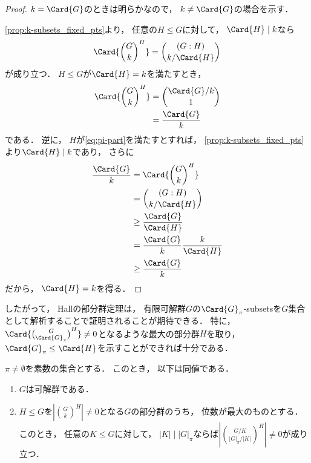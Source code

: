 \documentclass{jlreq}
\newcommand{\FixedPts}[2]{{#1}^{#2}}
\newcommand{\Index}[2]{\left(#2 : #1\right)}
\newcommand{\Order}[1]{\left| #1 \right|}
\begin{document}
	\begin{proof}
		$k = \Card{G}$のときは明らかなので，
		$k \ne \Card{G}$の場合を示す．
		
		\cref{prop:k-subsets_fixed_pts}より，
		任意の$H \le G$に対して，
		$\Card{H} \mid k$なら
		\begin{equation}
			\Card{\FixedPts{\binom{G}{k}}{H}}
			= \binom{\Index{H}{G}}{k / \Card{H}}
		\end{equation}
		が成り立つ．
		$H \le G$が$\Card{H} = k$を満たすとき，
		\begin{align}
			\Card{\FixedPts{\binom{G}{k}}{H}}
			&= \binom{\Card{G}/k}{1} \\
			&= \frac{\Card{G}}{k}
		\end{align}
		である．
		逆に，
		$H$が\cref{eq:pi-part}を満たすとすれば，
		\cref{prop:k-subsets_fixed_pts}より$\Card{H} \mid k$であり，
		さらに
		\begin{align}
			\frac{\Card{G}}{k}
			&= \Card{\FixedPts{\binom{G}{k}}{H}} \\
			&= \binom{\Index{H}{G}}{k / \Card{H}} \\
			&\ge \frac{\Card{G}}{\Card{H}} \\
			&= \frac{\Card{G}}{k} \frac{k}{\Card{H}} \\
			&\ge \frac{\Card{G}}{k}
		\end{align}
		だから，
		$\Card{H} = k$を得る．
	\end{proof}
	
	したがって，
	Hallの部分群定理は，
	有限可解群$G$の$\Card{G}_\pi$-subsetsを$G$集合として解析することで証明されることが期待できる．
	特に，
	$\Card{\FixedPts{\binom{G}{\Card{G}_\pi}}{H}} \ne 0$となるような最大の部分群$H$を取り，
	$\Card{G}_\pi \le \Card{H}$を示すことができれば十分である．

	\begin{conjecture}
		$\pi \ne \emptyset$を素数の集合とする．
		このとき，
		以下は同値である．
		\begin{enumerate}
			\item $G$は可解群である．
			\item $H \le G$を$\Order{\FixedPts{\binom{G}{k}}{H}} \ne 0$となる$G$の部分群のうち，
			位数が最大のものとする．
			このとき，
			任意の$K \le G$に対して，
			$\Order{K} \mid \Order{G}_\pi$ならば$\Order{\FixedPts{\binom{G/K}{\Order{G}_\pi/\Order{K}}}{H}} \ne 0$が成り立つ．
		\end{enumerate}
	\end{conjecture}
	
\end{document}

